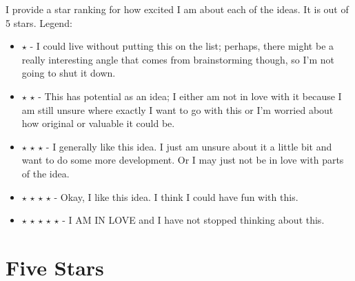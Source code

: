 \documentclass[12pt]{article}
\begin{document}
I provide a star ranking for how excited I am about each of the ideas. It is out of 5 stars. Legend:
\begin{itemize}
\item $\star$ - I could live without putting this on the list; perhaps, there might be a really interesting angle that comes from brainstorming though, so I'm not going to shut it down.
\item $\star$ $\star$ - This has potential as an idea; I either am not in love with it because I am still unsure where exactly I want to go with this or I'm worried about how original or valuable it could be.
\item $\star$ $\star$ $\star$ - I generally like this idea. I just am unsure about it a little bit and want to do some more development. Or I may just not be in love with parts of the idea.
\item $\star$ $\star$ $\star$ $\star$ - Okay, I like this idea. I think I could have fun with this. 
\item $\star$ $\star$ $\star$ $\star$ $\star$ - I AM IN LOVE and I have not stopped thinking about this.
\end{itemize}
\tableofcontents
\newpage
{}
\setcounter{page}{1}
\cfoot{\thepage}

\section{Five Stars}
\end{document}
